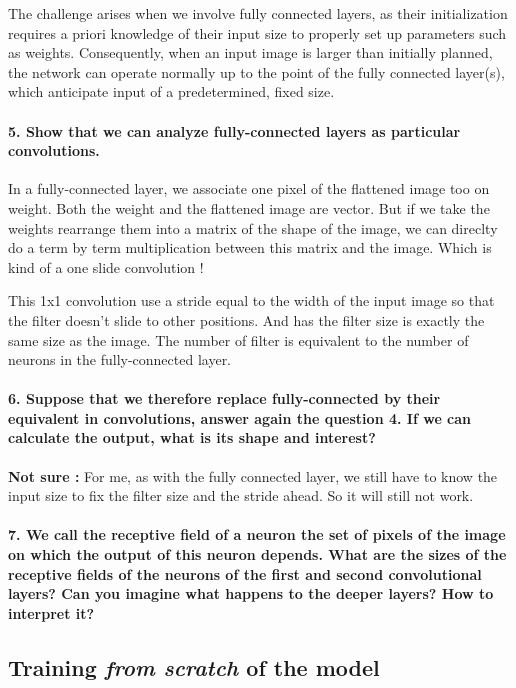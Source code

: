 \documentclass{article}
\theoremstyle{plain}%
\theoremstyle{definition}
\theoremstyle{remark}
\begin{document}
The challenge arises when we involve fully connected layers, as their initialization requires a priori knowledge of their input size to properly set up parameters such as weights. Consequently, when an input image is larger than initially planned, the network can operate normally up to the point of the fully connected layer(s), which anticipate input of a predetermined, fixed size.


\paragraph{5. Show that we can analyze fully-connected layers as particular convolutions.}
In a fully-connected layer, we associate one pixel of the flattened image too on weight. Both the weight and the flattened image are vector. But if we take the weights rearrange them into a matrix of the shape of the image, we can direclty do a term by term multiplication between this matrix and the image. Which is kind of a one slide convolution ! 

This 1x1 convolution use a stride equal to the width of the input image so that the filter doesn't slide to other positions. And has the filter size is exactly the same size as the image. The number of filter is equivalent to the number of neurons in the fully-connected layer.

\paragraph{6. Suppose that we therefore replace fully-connected by their equivalent in convolutions, answer again the question 4. If we can calculate the output, what is its shape and interest?}
\textbf{Not sure : }
For me, as with the fully connected layer,  we still have to know the input size to fix the filter size and the stride ahead. So it will still not work.

\paragraph{7. We call the receptive field of a neuron the set of pixels of the image on which the output of this neuron depends. What are the sizes of the receptive fields of the neurons of the first and second convolutional layers? Can you imagine what happens to the deeper layers? How to interpret it?}

\subsection{Training \textit{from scratch} of the model}
\end{document}
